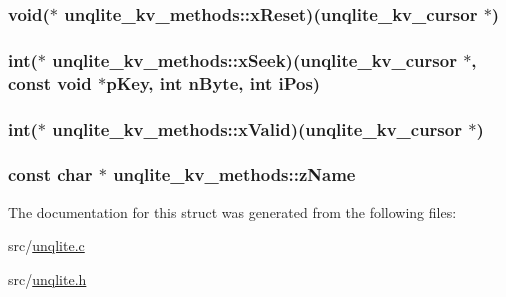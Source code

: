 \hypertarget{structunqlite__kv__methods_a0c5216e010e240483c1536d0d638f353}{
\subsubsection[{x\-Reset}]{\setlength{\rightskip}{0pt plus 5cm}void($\ast$ unqlite\-\_\-kv\-\_\-methods\-::x\-Reset)({\bf unqlite\-\_\-kv\-\_\-cursor} $\ast$)}}\label{d2/dfb/structunqlite__kv__methods_a0c5216e010e240483c1536d0d638f353}
\hypertarget{structunqlite__kv__methods_a56a566a04004c87f270a12b316deb087}{
\subsubsection[{x\-Seek}]{\setlength{\rightskip}{0pt plus 5cm}int($\ast$ unqlite\-\_\-kv\-\_\-methods\-::x\-Seek)({\bf unqlite\-\_\-kv\-\_\-cursor} $\ast$, const void $\ast$p\-Key, int n\-Byte, int i\-Pos)}}\label{d2/dfb/structunqlite__kv__methods_a56a566a04004c87f270a12b316deb087}
\hypertarget{structunqlite__kv__methods_a766810f47c6450157b01398f0d76f910}{
\subsubsection[{x\-Valid}]{\setlength{\rightskip}{0pt plus 5cm}int($\ast$ unqlite\-\_\-kv\-\_\-methods\-::x\-Valid)({\bf unqlite\-\_\-kv\-\_\-cursor} $\ast$)}}\label{d2/dfb/structunqlite__kv__methods_a766810f47c6450157b01398f0d76f910}
\hypertarget{structunqlite__kv__methods_affaa0bf51b8acf365e78d0ca969f0462}{
\subsubsection[{z\-Name}]{\setlength{\rightskip}{0pt plus 5cm}const char $\ast$ unqlite\-\_\-kv\-\_\-methods\-::z\-Name}}\label{d2/dfb/structunqlite__kv__methods_affaa0bf51b8acf365e78d0ca969f0462}


The documentation for this struct was generated from the following files\-:\begin{DoxyCompactItemize}
\item 
src/\hyperlink{unqlite_8c}{unqlite.\-c}\item 
src/\hyperlink{unqlite_8h}{unqlite.\-h}\end{DoxyCompactItemize}
